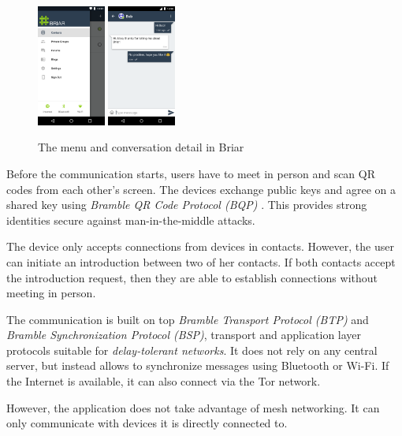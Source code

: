 \documentclass[conference,compsoc]{IEEEtran}
\begin{document}
\begin{figure}[h]
  \centering
  \includegraphics[width=0.2\textwidth]{briar1}
  \includegraphics[width=0.2\textwidth]{briar2}
  \caption{The menu and conversation detail in Briar \cite{briar_gplay}}
\end{figure}

Before the communication starts, users have to meet in person and scan QR codes from each other's screen. The devices exchange public keys and agree on a shared key using \textit{Bramble QR Code Protocol (BQP)} \cite{briar_bqp}. 
This provides strong identities secure against man-in-the-middle attacks.

The device only accepts connections from devices in contacts. However, the user can initiate an introduction between two of her contacts. If both contacts accept the introduction request, then they are able to establish connections without meeting in person.

The communication is built on top \textit{Bramble Transport Protocol (BTP)} and \textit{Bramble Synchronization Protocol (BSP)}, transport and application layer protocols suitable for \textit{delay-tolerant networks}. \cite{briar_stack} It does not rely on any central server, but instead allows to synchronize messages using Bluetooth or Wi-Fi. If the Internet is available, it can also connect via the Tor network.

However, the application does not take advantage of mesh networking. It can only communicate with devices it is directly connected to.
\end{document}
